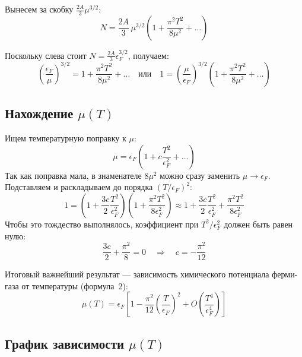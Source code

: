 \documentclass[../general/general]{subfiles}
\begin{document}
Вынесем за скобку $\frac{2A}{3}\mu^{3/2}$:
\begin{equation}
    N = \frac{2A}{3}\, \mu^{3/2} \left( 1 + \frac{\pi^2 T^2}{8\mu^2} + \ldots \right)
\end{equation}

Поскольку слева стоит $N = \frac{2A}{3}\epsilon_F^{3/2}$, получаем:
\begin{equation}
    \left(\frac{\epsilon_F}{\mu}\right)^{3/2} = 1 + \frac{\pi^2 T^2}{8\mu^2} + \ldots
    \quad \text{или} \quad
    1 = \left(\frac{\mu}{\epsilon_F}\right)^{3/2}\!\!\left(1 + \frac{\pi^2 T^2}{8\mu^2} + \ldots\right)
\end{equation}

\subsection{Нахождение $\mu(T)$}

Ищем температурную поправку к $\mu$:
\begin{equation}
    \mu = \epsilon_F\!\left(1 + c\frac{T^2}{\epsilon_F^2} + \ldots\right)
\end{equation}
Так как поправка мала, в знаменателе $8\mu^2$ можно сразу заменить $\mu \to \epsilon_F$. Подставляем и раскладываем до порядка $(T/\epsilon_F)^2$:
\begin{equation}
    1 = \left(1 + \frac{3c}{2}\frac{T^2}{\epsilon_F^2}\right)\!\left(1 + \frac{\pi^2 T^2}{8\epsilon_F^2}\right) \approx 1 + \frac{3c}{2}\frac{T^2}{\epsilon_F^2} + \frac{\pi^2 T^2}{8\epsilon_F^2}
\end{equation}
Чтобы это тождество выполнялось, коэффициент при $T^2/\epsilon_F^2$ должен быть равен нулю:
\begin{equation}
    \frac{3c}{2} + \frac{\pi^2}{8} = 0 \quad \Longrightarrow \quad c = -\frac{\pi^2}{12}
\end{equation}

Итоговый важнейший результат --- зависимость химического потенциала ферми-газа от температуры (формула~2):
\begin{equation}
    \boxed{\mu(T) = \epsilon_F\left[1 - \frac{\pi^2}{12}\left(\frac{T}{\epsilon_F}\right)^2 + O\!\left(\frac{T^4}{\epsilon_F^4}\right)\right]}
    \label{eq:mu_fermi}
\end{equation}

\subsection{График зависимости $\mu(T)$}
\end{document}

